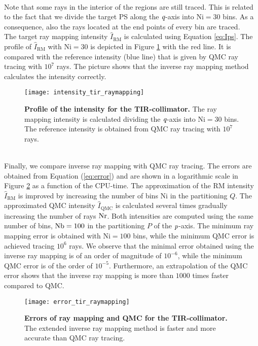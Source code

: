 \\ \indent Note that some rays in the interior of the regions are still traced. This is related to the fact that we divide the target PS along the $\textit{q}$-axis into $\textrm{Ni}=30$ bins. As a consequence, also the rays located at the end points of every bin are traced. \\
\indent The target ray mapping intensity $\hat{I}_{\textrm{RM}}$ is calculated using Equation \ref{eq:Ips}. The profile of $\hat{I}_{\textrm{RM}}$ with $\textrm{Ni}=30$ is depicted in Figure \ref{fig:intensity_tir_raymapping} with the red line. It is compared with the reference intensity (blue line) that is given by QMC ray tracing with $10^7$ rays. The picture shows that the inverse ray mapping method calculates the intensity correctly.
\begin{figure}[t]
  \begin{center}
  \texttt{[image: intensity\_tir\_raymapping]}
  \end{center}
  \caption{\textbf{Profile of the intensity for the TIR-collimator.}
 The ray mapping intensity is calculated dividing the $\textit{q}$-axis into $\textrm{Ni}=30$ bins. The reference intensity is obtained from QMC ray tracing with $10^7$ rays.}
\label{fig:intensity_tir_raymapping}
 \end{figure}
\\ \indent 
Finally, we compare inverse ray mapping with QMC ray tracing. The errors are obtained from Equation (\ref{eq:error}) and are shown in a logarithmic scale in Figure \ref{fig:error_tir_raymapping} as a function of the CPU-time. The approximation of the RM intensity $\hat{I}_{\textrm{RM}}$ is improved by increasing the number of bins $\textrm{Ni}$ in the partitioning $Q$. The approximated QMC intensity $\hat{I}_{\textrm{QMC}}$ is calculated several times gradually increasing the number of rays $\textrm{Nr}$. Both intensities are computed using the same number of bins, $\textrm{Nb}=100$ in the partitioning $P$ of the $\textit{p}$-axis. The minimum ray mapping error is obtained with $\textrm{Ni}=100$ bins, while the minimum QMC error is achieved tracing $10^6$ rays. We observe that the minimal error obtained using the inverse ray mapping is of an order of magnitude of $10^{-6}$, while the minimum QMC error is of the order of $10^{-5}$. Furthermore, an extrapolation of the QMC error shows that the inverse ray mapping is more than $1000$ times faster compared to QMC.
\begin{figure}[t]
  \begin{center}
  \texttt{[image: error\_tir\_raymapping]}
  \end{center}
  \caption{\textbf{Errors of ray mapping and QMC for the TIR-collimator.}
 The extended inverse ray mapping method is faster and more accurate than QMC ray tracing.}
\label{fig:error_tir_raymapping}
 \end{figure}
